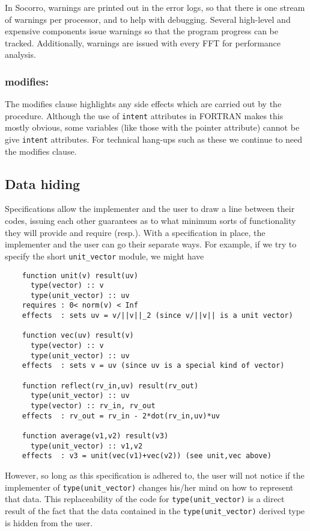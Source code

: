 In Socorro, warnings are printed out in the error logs, so that there is
one stream of warnings per processor, and to help with debugging.  Several
high-level and expensive components issue warnings so that the program
progress can be tracked.  Additionally, warnings are issued with every 
FFT for performance analysis.

\subsubsection{modifies: }

The modifies clause highlights any side effects which are carried
out by the procedure.  Although the use of \verb+intent+ attributes
in FORTRAN makes this mostly obvious, some variables (like those
with the pointer attribute) cannot be give \verb+intent+ attributes.
For technical hang-ups such as these we continue to need the
modifies clause.

\subsection{Data hiding}

Specifications allow the implementer and the user to draw a line
between their codes, issuing each other guarantees as to what minimum
sorts of functionality they will provide and require (resp.).  With a
specification in place, the implementer and the user can go their
separate ways.  For example, if we try to specify the short
\verb+unit_vector+ module, we might have

\begin{verbatim}
    function unit(v) result(uv)
      type(vector) :: v
      type(unit_vector) :: uv
    requires : 0< norm(v) < Inf
    effects  : sets uv = v/||v||_2 (since v/||v|| is a unit vector)

    function vec(uv) result(v)
      type(vector) :: v
      type(unit_vector) :: uv
    effects  : sets v = uv (since uv is a special kind of vector)

    function reflect(rv_in,uv) result(rv_out)
      type(unit_vector) :: uv
      type(vector) :: rv_in, rv_out
    effects  : rv_out = rv_in - 2*dot(rv_in,uv)*uv

    function average(v1,v2) result(v3) 
      type(unit_vector) :: v1,v2
    effects  : v3 = unit(vec(v1)+vec(v2)) (see unit,vec above)
\end{verbatim}

However, so long as this specification is adhered to, the user will
not notice if the implementer of \verb+type(unit_vector)+ changes
his/her mind on how to represent that data.  This replaceability of the
code for \verb+type(unit_vector)+ is a direct result of the fact that
the data contained in the \verb+type(unit_vector)+ derived type is
hidden from the user.

